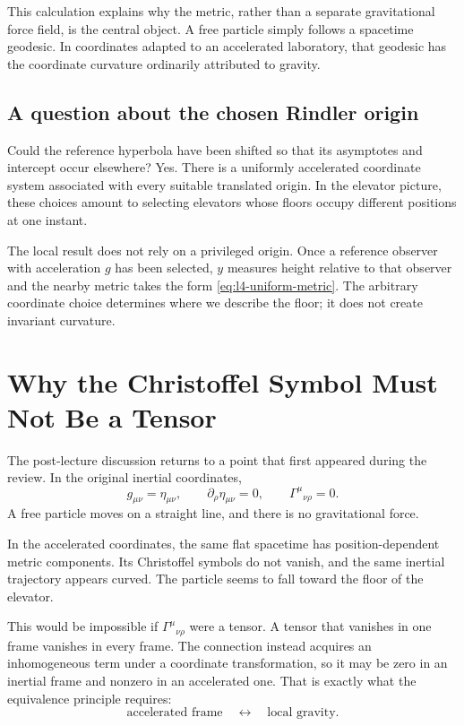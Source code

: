 This calculation explains why the metric, rather than a separate gravitational force field, is the central object. A free particle simply follows a spacetime geodesic. In coordinates adapted to an accelerated laboratory, that geodesic has the coordinate curvature ordinarily attributed to gravity.

\subsection{A question about the chosen Rindler origin}

Could the reference hyperbola have been shifted so that its asymptotes and intercept occur elsewhere? Yes. There is a uniformly accelerated coordinate system associated with every suitable translated origin. In the elevator picture, these choices amount to selecting elevators whose floors occupy different positions at one instant.

The local result does not rely on a privileged origin. Once a reference observer with acceleration \(g\) has been selected, \(y\) measures height relative to that observer and the nearby metric takes the form \eqref{eq:l4-uniform-metric}. The arbitrary coordinate choice determines where we describe the floor; it does not create invariant curvature.

\section{Why the Christoffel Symbol Must Not Be a Tensor}

The post-lecture discussion returns to a point that first appeared during the review. In the original inertial coordinates,
\begin{equation}
g_{\mu\nu}=\eta_{\mu\nu},
\qquad
\partial_\rho\eta_{\mu\nu}=0,
\qquad
\Gamma^\mu{}_{\nu\rho}=0.
\end{equation}
A free particle moves on a straight line, and there is no gravitational force.

In the accelerated coordinates, the same flat spacetime has position-dependent metric components. Its Christoffel symbols do not vanish, and the same inertial trajectory appears curved. The particle seems to fall toward the floor of the elevator.

This would be impossible if \(\Gamma^\mu{}_{\nu\rho}\) were a tensor. A tensor that vanishes in one frame vanishes in every frame. The connection instead acquires an inhomogeneous term under a coordinate transformation, so it may be zero in an inertial frame and nonzero in an accelerated one. That is exactly what the equivalence principle requires:
\begin{equation}
\text{accelerated frame}
\quad\longleftrightarrow\quad
\text{local gravity}.
\end{equation}

